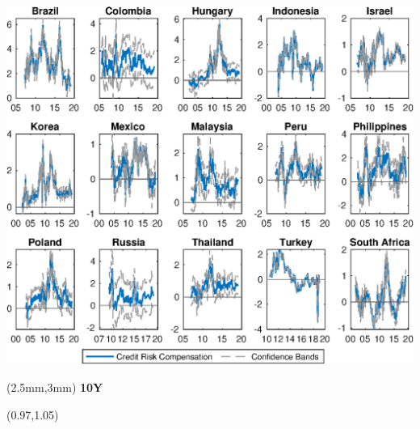 \documentclass[12pt, aspectratio=169, xcolor=dvipsnames]{beamer}
\begin{document}
\begin{frame}[label=crcCI]
\begin{center}							%
\includegraphics[trim={0cm 0cm 0cm 0cm},clip,height=0.95\textheight,width=\linewidth]{../Figures/Estimation/bsl_cr_CI_10y_V1.eps} \\
\end{center}
\begin{textblock*}{15cm}(2.5mm,3mm)
	\textbf{10Y}
\end{textblock*}
\begin{textblock*}{5cm}(0.97\textwidth,1.05\textheight)
\hyperlink{YldDcmp10}{}
\end{textblock*}
\end{frame}

\end{document}
